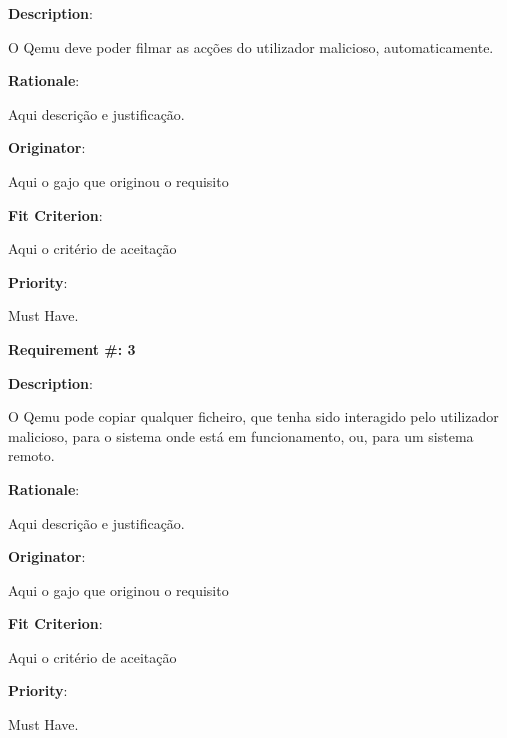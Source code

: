 \begin{description}
\item \textbf{Description}:

O Qemu deve poder filmar as acções do utilizador malicioso, automaticamente. \\


\item \textbf{Rationale}:

Aqui descrição e justificação. \\
\item \textbf{Originator}:

Aqui o gajo que originou o requisito\\

\item \textbf{Fit Criterion}:

Aqui o critério de aceitação \\

\item \textbf{Priority}:

Must Have. \\

\end{description}

\pagebreak






\begin{minipage}{0.55\textwidth}
\begin{flushleft}\textbf{Requirement \#: 3}\end{flushleft}
\end{minipage}
\begin{minipage}{0.4\textwidth}
\end{minipage}

\begin{description}
\item \textbf{Description}:

O Qemu pode copiar qualquer ficheiro, que tenha sido interagido pelo utilizador malicioso, para o sistema onde está em funcionamento, 
ou, para um sistema remoto.

\item \textbf{Rationale}:

Aqui descrição e justificação. \\
\item \textbf{Originator}:

Aqui o gajo que originou o requisito\\

\item \textbf{Fit Criterion}:

Aqui o critério de aceitação \\

\item \textbf{Priority}:

Must Have. \\

\end{description}

